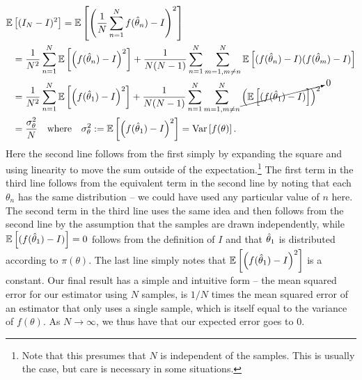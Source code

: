 \begin{align}
\mathbb{E} &\left[(I_N-I)^2\right] = \mathbb{E}\left[\left(\frac{1}{N}\sum_{n=1}^{N}f(\hat{\theta}_n) - I\right)^2\right] \nonumber \\
&= \frac{1}{N^2}\sum_{n=1}^{N} \mathbb{E}\left[ \left(f(\hat{\theta}_n)-I\right)^2\right] + 
\frac{1}{N(N-1)}\sum_{n=1}^{N}\sum_{m=1,m\neq n}^{N} \mathbb{E}\left[ (f(\hat{\theta}_n)-I)(f(\hat{\theta}_m)-I)\right] \nonumber \\
&= \frac{1}{N^2}\sum_{n=1}^{N} \mathbb{E}\left[ \left(f(\hat{\theta}_1)-I\right)^2\right] + 
\frac{1}{N(N-1)}\sum_{n=1}^{N}\sum_{m=1,m\neq n}^{N} \cancelto{0}{\left(\mathbb{E}\left[(f(\hat{\theta}_1)-I)\right]\right)^2} \nonumber \\
&= \frac{\sigma_{\theta}^2}{N}  \quad \text{where} \quad \sigma_{\theta}^2 := \mathbb{E}\left[ \left(f(\hat{\theta}_1)-I\right)^2\right]
= \operatorname*{Var} \left[f(\theta)\right].
\end{align}
Here the second line follows from the first simply by expanding the square and using linearity
to move the sum outside of the expectation.\footnote{Note that this presumes that $N$ is independent
	of the samples.  This is usually the case, but care is necessary in some situations.}
The first term in the third line follows from the equivalent term in the second line by noting that
each $\theta_n$ has the same distribution -- we could have used any particular value of $n$ here.
The second term in the third line uses the same idea and then
 follows from the second line by the assumption that the samples are drawn
independently, while $\mathbb{E}\left[(f(\hat{\theta}_1)-I)\right]=0$ follows from the definition of $I$
and that $\hat{\theta}_1$ is distributed according to $\pi(\theta)$.  The last line
simply notes that $\mathbb{E}\left[ \left(f(\hat{\theta}_1)-I\right)^2\right]$ is a constant.
  Our final result has a simple and intuitive form -- the mean squared error for
our estimator using $N$ samples, is $1/N$ times the mean squared error of an estimator that only uses
a single sample, which is itself equal to the variance of $f(\theta)$.  As $N\rightarrow\infty$, we thus
have that our expected error goes to $0$.

